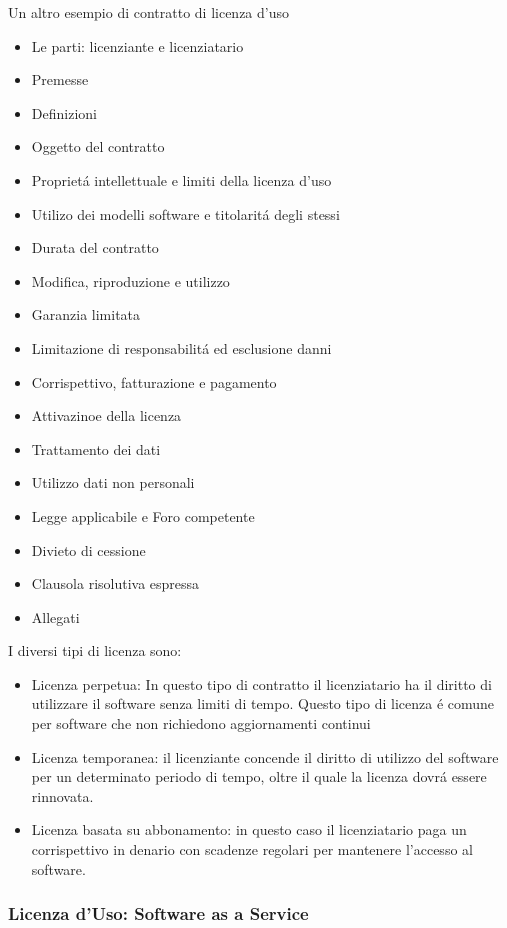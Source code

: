 \documentclass{article}
\begin{document}
Un altro esempio di contratto di licenza d'uso
\begin{itemize}
    \item Le parti: licenziante e licenziatario
    \item Premesse
    \item Definizioni
    \item Oggetto del contratto
    \item Propriet\'a intellettuale e limiti della licenza d'uso
    \item Utilizo dei modelli software e titolarit\'a degli stessi
    \item Durata del contratto
    \item Modifica, riproduzione e utilizzo
    \item Garanzia limitata
    \item Limitazione di responsabilit\'a ed esclusione danni
    \item Corrispettivo, fatturazione e pagamento
    \item Attivazinoe della licenza
    \item Trattamento dei dati
    \item Utilizzo dati non personali
    \item Legge applicabile e Foro competente
    \item Divieto di cessione
    \item Clausola risolutiva espressa
    \item Allegati
\end{itemize}

I diversi tipi di licenza sono:
\begin{itemize}
    \item Licenza perpetua: In questo tipo di contratto il licenziatario ha il diritto di utilizzare il software senza limiti di tempo. Questo tipo di licenza \'e comune per software che non richiedono aggiornamenti continui
    \item Licenza temporanea: il licenziante concende il diritto di utilizzo del software per un determinato periodo di tempo, oltre il quale la licenza dovr\'a essere rinnovata.
    \item Licenza basata su abbonamento: in questo caso il licenziatario paga un corrispettivo in denario con scadenze regolari per mantenere l'accesso al software.
\end{itemize}

\subsubsection{Licenza d'Uso: Software as a Service}
\end{document}
